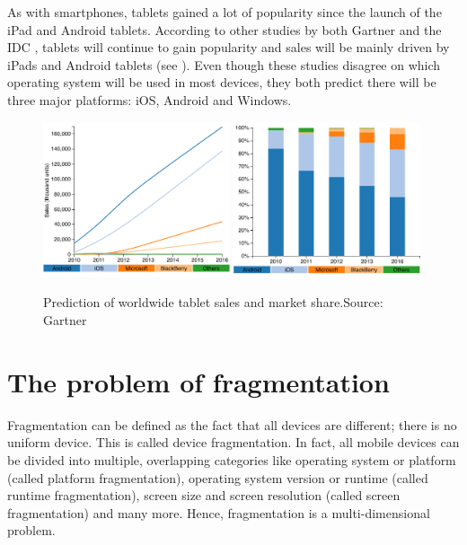 As with smartphones, tablets gained a lot of popularity since the launch of the iPad and Android tablets. According to other studies by both Gartner \citep{Gartner:11tab,Gartner:12tab} and the IDC \citep{IDC:tablet}, tablets will continue to gain popularity and sales will be mainly driven by iPads and Android tablets (see ). Even though these studies disagree on which operating system will be used in most devices, they both predict there will be three major platforms: iOS, Android and Windows. 

\begin{figure}[h]
    \centering
    \includegraphics[width=0.49\textwidth]{figs/tablet_sales.pdf}
    \includegraphics[width=0.49\textwidth]{figs/tablet_share.pdf}
    \caption{Prediction of worldwide tablet sales and market share.\newline Source: Gartner \citeGartnerTab}
    \label{fig:tablet}
\end{figure}

\section{The problem of fragmentation}

Fragmentation can be defined as the fact that all devices are different; there is no uniform device. This is called device fragmentation. In fact, all mobile devices can be divided into multiple, overlapping categories like operating system or platform (called platform fragmentation), operating system version or runtime (called runtime fragmentation), screen size and screen resolution (called screen fragmentation) and many more. Hence, fragmentation is a multi-dimensional problem. 

